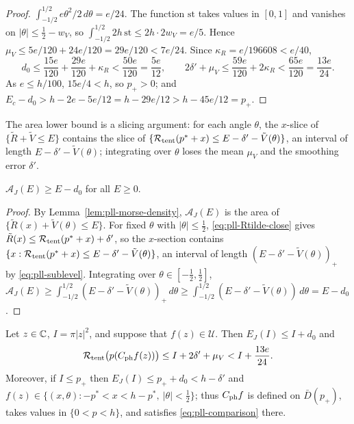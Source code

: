 \begin{proof}
$\int_{-1/2}^{1/2}e\theta^2/2\,d\theta=e/24$. The function $\mathrm{st}$ takes values in $[0,1]$ and vanishes on
$|\theta|\le\frac12-w_V$, so $\int_{-1/2}^{1/2}2h\,\mathrm{st}\le2h\cdot2w_V=e/5$. Hence
$\mu_V\le5e/120+24e/120=29e/120<7e/24$. Since $\kappa_R=e/196608<e/40$,
\[
 d_0\le\frac{15e}{120}+\frac{29e}{120}+\kappa_R<\frac{50e}{120}=\frac{5e}{12},\qquad
 2\delta'+\mu_V\le\frac{59e}{120}+2\kappa_R<\frac{65e}{120}=\frac{13e}{24}.
\]
As $e\le h/100$, $15e/4<h$, so $p_+>0$; and $E_c-d_0>h-2e-5e/12=h-29e/12>h-45e/12=p_+$.
\end{proof}

The area lower bound is a slicing argument: for each angle $\theta$, the $x$-slice of
$\{\tilde R+\tilde V\le E\}$ contains the slice of $\{\mathcal{R}_{\rm tent}(p^*+x)\le E-\delta'-\tilde V(\theta)\}$, an
interval of length $E-\delta'-\tilde V(\theta)$; integrating over $\theta$ loses the mean $\mu_V$ and the smoothing
error $\delta'$.

\begin{lemma}\label{lem:pll-area}
$\mathcal A_J(E)\ge E-d_0$ for all $E\ge0$.
\end{lemma}

\begin{proof}
By Lemma~\ref{lem:pll-morse-density}, $\mathcal A_J(E)$ is the area of $\{\tilde R(x)+\tilde V(\theta)\le E\}$. For
fixed $\theta$ with $|\theta|\le\frac12$, \eqref{eq:pll-Rtilde-close} gives
$\tilde R(x)\le\mathcal{R}_{\rm tent}(p^*+x)+\delta'$, so the $x$-section contains
$\{x:\mathcal{R}_{\rm tent}(p^*+x)\le E-\delta'-\tilde V(\theta)\}$, an interval of length $(E-\delta'-\tilde V(\theta))_+$
by \eqref{eq:pll-sublevel}. Integrating over $\theta\in[-\frac12,\frac12]$,
$\mathcal A_J(E)\ge\int_{-1/2}^{1/2}(E-\delta'-\tilde V(\theta))_+\,d\theta\ge\int_{-1/2}^{1/2}(E-\delta'-\tilde V(\theta))\,d\theta
=E-d_0$.
\end{proof}

\begin{proposition}\label{prop:pll-comparison}
Let $z\in\mathbb{C}$, $I=\pi|z|^2$, and suppose that $f(z)\in\mathcal U$. Then $E_J(I)\le I+d_0$ and
\begin{equation}\label{eq:pll-comparison}
 \mathcal{R}_{\rm tent}\bigl(p(C_{\rm ph}f(z))\bigr)\le I+2\delta'+\mu_V<I+\frac{13e}{24}.
\end{equation}
Moreover, if $I\le p_+$ then $E_J(I)\le p_++d_0<h-\delta'$ and
$f(z)\in\{(x,\theta):-p^*<x<h-p^*,\ |\theta|<\frac12\}$; thus $C_{\rm ph}f$ is defined on $\bar D(p_+)$, takes
values in $\{0<p<h\}$, and satisfies \eqref{eq:pll-comparison} there.
\end{proposition}


